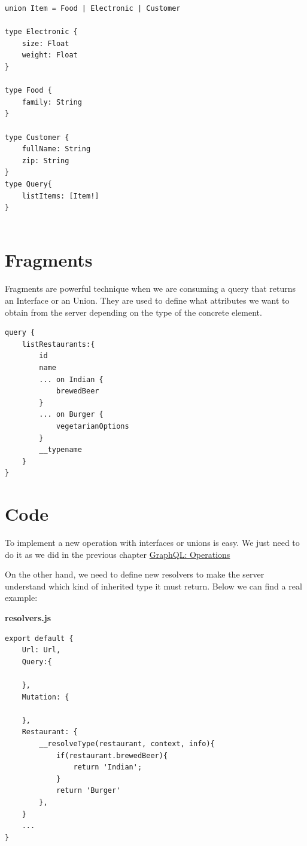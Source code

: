 \documentclass[]{book}
\begin{document}
\begin{verbatim}
union Item = Food | Electronic | Customer

type Electronic {
    size: Float
    weight: Float
}

type Food {
    family: String
}

type Customer {
    fullName: String
    zip: String
}
type Query{
    listItems: [Item!]
}
 
\end{verbatim}

\section{Fragments}\label{fragments}

Fragments are powerful technique when we are consuming a query that
returns an Interface or an Union. They are used to define what
attributes we want to obtain from the server depending on the type of
the concrete element.

\begin{verbatim}
query {
    listRestaurants:{
        id
        name
        ... on Indian {
            brewedBeer
        }
        ... on Burger {
            vegetarianOptions
        }
        __typename
    }
}  
\end{verbatim}

\section{Code}\label{code-2}

To implement a new operation with interfaces or unions is easy. We just
need to do it as we did in the previous chapter
\protect\hyperlink{GraphQL:-Operations}{GraphQL: Operations}

On the other hand, we need to define new resolvers to make the server
understand which kind of inherited type it must return. Below we can
find a real example:

\textbf{resolvers.js}

\begin{verbatim}
export default {
    Url: Url,
    Query:{
    
    },
    Mutation: {
    
    },
    Restaurant: {
        __resolveType(restaurant, context, info){
            if(restaurant.brewedBeer){
                return 'Indian';
            }
            return 'Burger'
        },
    }
    ...
}
\end{verbatim}
\end{document}
